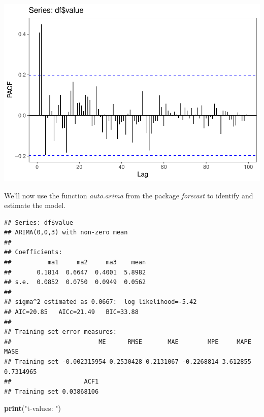 \documentclass[]{article}
\newenvironment{Shaded}{\begin{snugshade}}{\end{snugshade}}
\newcommand{\DataTypeTok}[1]{\textcolor[rgb]{0.13,0.29,0.53}{#1}}
\newcommand{\DecValTok}[1]{\textcolor[rgb]{0.00,0.00,0.81}{#1}}
\newcommand{\KeywordTok}[1]{\textcolor[rgb]{0.13,0.29,0.53}{\textbf{#1}}}
\newcommand{\NormalTok}[1]{#1}
\newcommand{\OperatorTok}[1]{\textcolor[rgb]{0.81,0.36,0.00}{\textbf{#1}}}
\newcommand{\StringTok}[1]{\textcolor[rgb]{0.31,0.60,0.02}{#1}}
\begin{document}
\includegraphics{Econo2_P4_files/figure-latex/plots-6.pdf}

We'll now use the function \emph{auto.arima} from the package
\emph{forecast} to identify and estimate the model.

\begin{Shaded}
\end{Shaded}

\begin{verbatim}
## Series: df$value 
## ARIMA(0,0,3) with non-zero mean 
## 
## Coefficients:
##          ma1     ma2     ma3    mean
##       0.1814  0.6647  0.4001  5.8982
## s.e.  0.0852  0.0750  0.0949  0.0562
## 
## sigma^2 estimated as 0.0667:  log likelihood=-5.42
## AIC=20.85   AICc=21.49   BIC=33.88
## 
## Training set error measures:
##                        ME      RMSE       MAE        MPE     MAPE      MASE
## Training set -0.002315954 0.2530428 0.2131067 -0.2268814 3.612855 0.7314965
##                    ACF1
## Training set 0.03868106
\end{verbatim}

\begin{Shaded}
\begin{Highlighting}[]
\KeywordTok{print}\NormalTok{(}\StringTok{"t-values: "}\NormalTok{)}
\end{Highlighting}
\end{Shaded}
\end{document}
